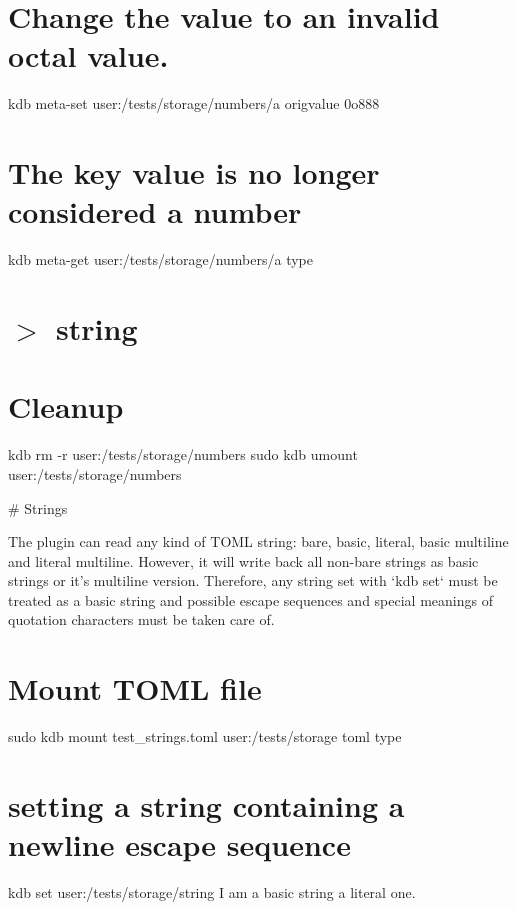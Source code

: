 \hypertarget{autotoc_md642_autotoc_md686}{}\section{Change the value to an invalid octal value.}\label{autotoc_md642_autotoc_md686}
kdb meta-\/set \textquotesingle{}user\+:/tests/storage/numbers/a\textquotesingle{} \textquotesingle{}origvalue\textquotesingle{} \textquotesingle{}0o888\textquotesingle{}\hypertarget{autotoc_md642_autotoc_md687}{}\section{The key value is no longer considered a number}\label{autotoc_md642_autotoc_md687}
kdb meta-\/get \textquotesingle{}user\+:/tests/storage/numbers/a\textquotesingle{} \textquotesingle{}type\textquotesingle{} \hypertarget{autotoc_md642_autotoc_md688}{}\section{$>$ string}\label{autotoc_md642_autotoc_md688}
\hypertarget{autotoc_md642_autotoc_md689}{}\section{Cleanup}\label{autotoc_md642_autotoc_md689}
kdb rm -\/r user\+:/tests/storage/numbers sudo kdb umount user\+:/tests/storage/numbers 
\begin{DoxyCode}
# Strings

The plugin can read any kind of TOML string: bare, basic, literal, basic multiline and literal multiline.
However, it will write back all non-bare strings as basic strings or it's multiline version.
Therefore, any string set with `kdb set` must be treated as a basic string and possible escape sequences
       and special meanings of quotation characters must be taken care of.
\end{DoxyCode}
 \hypertarget{autotoc_md642_autotoc_md690}{}\section{Mount T\+O\+M\+L file}\label{autotoc_md642_autotoc_md690}
sudo kdb mount test\+\_\+strings.\+toml user\+:/tests/storage toml type\hypertarget{autotoc_md642_autotoc_md691}{}\section{setting a string containing a newline escape sequence}\label{autotoc_md642_autotoc_md691}
kdb set \textquotesingle{}user\+:/tests/storage/string\textquotesingle{} \textquotesingle{}I am a basic string a literal one.\textquotesingle{}


